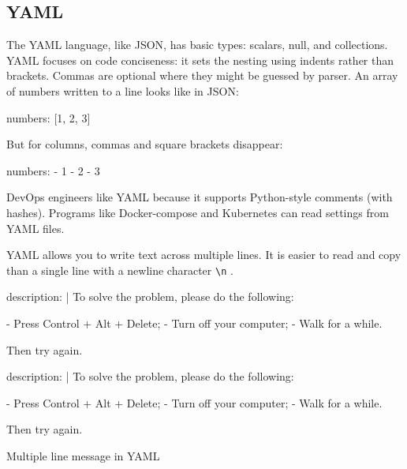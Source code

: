\fi

\subsection{YAML}


The YAML language, like JSON, has basic types: scalars, null, and collections. YAML focuses on code conciseness: it sets the nesting using indents rather than brackets. Commas are optional where they might be guessed by parser.  An array of numbers written to a line looks like in JSON:


\begin{yaml}
numbers: [1, 2, 3]
\end{yaml}

\noindent
But for columns, commas and square brackets disappear:

\begin{yaml}
numbers:
  - 1
  - 2
  - 3
\end{yaml}

DevOps engineers like YAML because it supports Python-style comments (with hashes). Programs like Docker-compose and Kubernetes can read settings from YAML files.

YAML allows you to write text across multiple lines. It is easier to read and copy than a single line with a newline character \verb|\n| .

\begin{listing}[ht!]

\ifnarrow

\begin{yaml}
description: |
  To solve the problem,
  please do the following:

  - Press Control + Alt + Delete;
  - Turn off your computer;
  - Walk for a while.

  Then try again.
\end{yaml}

\else

\begin{yaml}
description: |
  To solve the problem, please do the following:

  - Press Control + Alt + Delete;
  - Turn off your computer;
  - Walk for a while.

  Then try again.
\end{yaml}

\fi

\caption{ Multiple line message in YAML}
\label{fig:yaml-multi-line}

\end{listing}

